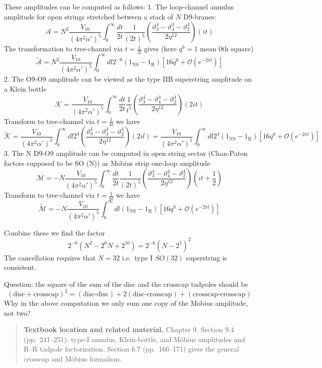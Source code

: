 \documentclass[
  10pt,
  a4paper,
  openany]{book}
\begin{document}
These amplitudes can be computed as follows: 1. The loop-channel annulus
amplitude for open strings stretched between a stack of \(N\) D9-branes:
\[
\mathcal{A}=N^2 \frac{V_{10}}{(4\pi^2\alpha')^5}\int_{0}^\infty \frac{dt}{2t} \frac{1}{(2t)^5} \left( \frac{{\vartheta_{3}^4-\vartheta_{4}^4-\vartheta_{2}^4}}{2\eta^{12}} \right)(it)
\] The transformation to tree-channel via \(t=\frac{1}{2l}\) gives (here
\(q^0=1\) mean 0th square) \[
\tilde{\mathcal{A}}=N^2 \frac{V_{10}}{(4\pi^2\alpha')^5}\int_{0}^\infty dl 2^{-6}(1_{\mathrm{NS}}-1_{\mathrm{R}})[16q^0+\mathcal{O}(e^{-2\pi l})]
\] 2. The O9-O9 amplitude can be viewed as the type IIB superstring
amplitude on a Klein bottle \[
\mathcal{K}=\frac{V_{10}}{(4\pi^2\alpha')^5}\int_{0}^\infty \frac{dt}{2t} \frac{1}{t^5} \left( \frac{{\vartheta_{3}^4-\vartheta_{4}^4-\vartheta_{2}^4}}{2\eta^{12}} \right)(2it)
\] Transform to tree-channel via \(t=\frac{1}{4l}\) we have \[
\tilde{\mathcal{K}}=\frac{V_{10}}{(4\pi^2\alpha')^5}\int_{0}^\infty dl 2^4\left( \frac{{\vartheta_{3}^4-\vartheta_{4}^4-\vartheta_{2}^4}}{2\eta^{12}} \right)(2il)=\frac{V_{10}}{(4\pi^2\alpha')^5}\int_{0}^\infty dl 2^4(1_{\mathrm{NS}}-1_{\mathrm{R}})[16q^0+\mathcal{O}(e^{-2\pi l})]
\] 3. The N D9-O9 amplitude can be computed in open string sector
(Chan-Paton factors supposed to be SO (N)) as Mobius strip one-loop
amplitude \[
\mathcal{M}=-N\frac{V_{10}}{(4\pi^2\alpha')^5}\int_{0}^\infty \frac{dt}{2t} \frac{1}{(2t)^5} \left( \frac{{\vartheta_{3}^4-\vartheta_{4}^4-\vartheta_{2}^4}}{2\eta^{12}} \right)\left( it+\frac{1}{2} \right)
\] Transform to tree-channel via \(t=\frac{1}{8l}\) we have \[
\tilde{\mathcal{M}}=-N \frac{V_{10}}{(4\pi^2\alpha')^5}\int_{0}^\infty dl (1_{\mathrm{NS}}-1_{\mathrm{R}})[16q^0+\mathcal{O}(e^{-2\pi l})]
\]

Combine these we find the factor \[
2^{-6}(N^2-2^6N+2^{10})=2^{-6}(N-2^5)^2
\] The cancellation requires that \(N=32\) i.e.~type I \(SO(32)\)
superstring is consistent.

Question: the square of the sum of the disc and the crosscap tadpoles
should be \[
(\text{disc}+\text{crosscap})^2=(\text{disc-disc})+2(\text{disc-crosscap})+(\text{crosscap-crosscap})
\] Why in the above computation we only sum one copy of the Mobius
amplitude, not two?

\begin{quote}
\textbf{Textbook location and related material.} Chapter 9, Section 9.4
(pp.~241--251): type-I annulus, Klein-bottle, and Möbius amplitudes and
R--R tadpole factorization. Section 6.7 (pp.~166--171) gives the general
crosscap and Möbius formalism.
\end{quote}
\end{document}

